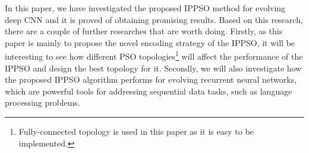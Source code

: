 \documentclass[conference]{IEEEtran}
\begin{document}
In this paper, we have investigated the proposed IPPSO method for evolving deep CNN and it is proved of obtaining promising results. Based on this research, there are a couple of further researches that are worth doing. Firstly, as this paper is mainly to propose the novel encoding strategy of the IPPSO, it will be interesting to see how different PSO topologies\footnote{Fully-connected topology is used in this paper as it is easy to be implemented.} will affect the performance of the IPPSO and design the best topology for it. Secondly, we will also investigate how the proposed IPPSO algorithm performs for evolving recurrent neural networks, which are powerful tools for addressing sequential data tasks, such as language processing problems.
\end{document}

